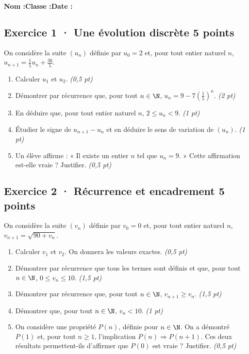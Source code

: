 \smallskip\textbf{Nom :}\enspace\dotfill\quad\textbf{Classe :}\enspace\dotfill\quad\textbf{Date :}\enspace\dotfill

\subsection*{Exercice 1 · Une évolution discrète \hfill 5 points}On considère la suite $(u_n)$ définie par $u_0=2$ et, pour tout entier naturel $n$, $u_{n+1}=\frac{1}{5}u_n+\frac{36}{5}$.

\begin{enumerate}

\item Calculer $u_1$ et $u_2$. \hfill\textit{(0,5 pt)}

\item Démontrer par récurrence que, pour tout $n\in\N$, $u_n=9-7\left(\frac{1}{5}\right)^n$. \hfill\textit{(2 pt)}

\item En déduire que, pour tout entier naturel $n$, $2\le u_n<9$. \hfill\textit{(1 pt)}

\item Étudier le signe de $u_{n+1}-u_n$ et en déduire le sens de variation de $(u_n)$. \hfill\textit{(1 pt)}

\item Un élève affirme : « Il existe un entier $n$ tel que $u_n=9$. » Cette affirmation est-elle vraie ? Justifier. \hfill\textit{(0,5 pt)}

\end{enumerate}

\subsection*{Exercice 2 · Récurrence et encadrement \hfill 5 points}On considère la suite $(v_n)$ définie par $v_0=0$ et, pour tout entier naturel $n$, $v_{n+1}=\sqrt{90+v_n}$.

\begin{enumerate}

\item Calculer $v_1$ et $v_2$. On donnera les valeurs exactes. \hfill\textit{(0,5 pt)}

\item Démontrer par récurrence que tous les termes sont définis et que, pour tout $n\in\N$, $0\le v_n\le10$. \hfill\textit{(1,5 pt)}

\item Démontrer par récurrence que, pour tout $n\in\N$, $v_{n+1}\ge v_n$. \hfill\textit{(1,5 pt)}

\item Démontrer que, pour tout $n\in\N$, $v_n<10$. \hfill\textit{(1 pt)}

\item On considère une propriété $P(n)$, définie pour $n\in\N$. On a démontré $P(1)$ et, pour tout $n\ge1$, l'implication $P(n)\Rightarrow P(n+1)$. Ces deux résultats permettent-ils d'affirmer que $P(0)$ est vraie ? Justifier. \hfill\textit{(0,5 pt)}

\end{enumerate}

